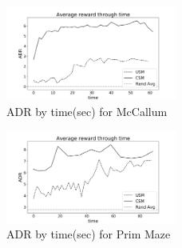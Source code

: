 \documentclass{article}
\begin{document}
\begin{figure}
	\centering
	\includegraphics[width=0.5\textwidth]{06-13-21-48/mccallum_result.png} %
	\caption{ADR by time(sec) for McCallum} %
	\label{fig:mccallum_result} %
\end{figure}

\begin{figure}
	\centering
	\includegraphics[width=0.5\textwidth]{06-13-21-48/prim_maze_result.png} %
	\caption{ADR by time(sec) for Prim Maze} %
	\label{fig:prim_maze_result} %
\end{figure}


% 
% 
%  
%  
%
\end{document}
